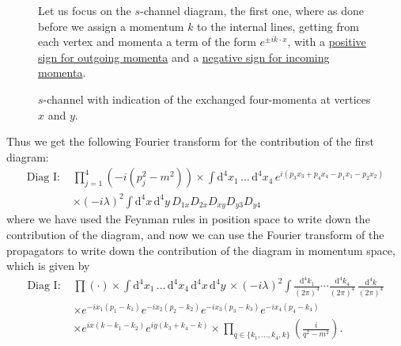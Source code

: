 \begin{figure}[H]
\begin{minipage}{0.6\textwidth}
        \caption{$s$-channel with indication of the exchanged four-momenta at vertices $x$ and $y$.}
        \label{fig:s_channel_momenta}
    \end{minipage}
    \hfill
    \begin{minipage}{0.35\textwidth}
        Let us focus on the \(s\)-channel diagram, the first one, where as done before we assign a momentum \(k\) to the internal lines, getting from each vertex and momenta a term of the form \(e^{\pm i k \cdot x}\), with a \uline{positive sign for outgoing momenta} and a \uline{negative sign for incoming momenta}.
    \end{minipage}
\end{figure}
Thus we get the following Fourier transform for the contribution of the first diagram:
\[
    \begin{aligned}
        \text{Diag I: } & \prod_{j=1}^4 \left( -i(p_j^2 -m^2) \right) \times \int \mathrm{d}^4 x_1 \, \ldots\,\mathrm{d}^4 x_4 \, e^{i(p_3 x_3 + p_4 x_4 - p_1 x_1 - p_2 x_2)} \\
                        & \times (-i\lambda)^2 \int \mathrm{d}^4 x\,\mathrm{d}^4 y \, D_{1 x} D_{2 x} D_{x y} D_{y3} D_{y4}
    \end{aligned}
\]
where we have used the Feynman rules in position space to write down the contribution of the diagram, and now we can use the Fourier transform of the propagators to write down the contribution of the diagram in momentum space, which is given by
\[
    \begin{aligned}
        \text{Diag I: } & \prod (\cdot) \times \int \mathrm{d}^4 x_1 \, \ldots\,\mathrm{d}^4 x_4 \, \mathrm{d}^4 x \, \mathrm{d}^4 y \, \times (-i \lambda)^2 \int \frac{\mathrm{d}^4 k_1}{(2\pi)^4} \cdots \frac{\mathrm{d}^4 k_4}{(2\pi)^4} \, \frac{\mathrm{d}^4 k}{(2\pi)^4} \\
                        & \times e^{-i x_1 (p_1 - k_1)} e^{-i x_2 (p_2 - k_2)} e^{-i x_3 (p_3 - k_3)} e^{-i x_4 (p_4 - k_4)}                                                                                                                                                     \\
                        & \times e^{i x (k - k_1 - k_2)} e^{i y (k_3 + k_4 - k)} \times \prod_{q \in \{k_1,\ldots,k_4,k\}} \left( \frac{i}{q^2 - m^2} \right).
    \end{aligned}
\]
